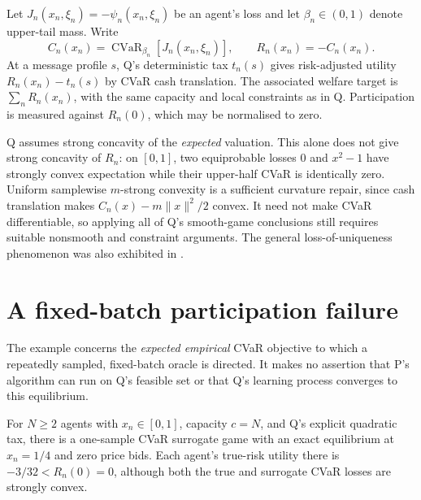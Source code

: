 \documentclass{article}
\begin{document}
Let \(J_n(x_n,\xi_n)=-\psi_n(x_n,\xi_n)\) be an agent's loss and let \(\beta_n\in(0,1)\) denote upper-tail mass. Write
\[
 C_n(x_n)=\operatorname{CVaR}_{\beta_n}[J_n(x_n,\xi_n)],
 \qquad R_n(x_n)=-C_n(x_n).
\]
At a message profile \(s\), Q's deterministic tax \(t_n(s)\) gives risk-adjusted utility \(R_n(x_n)-t_n(s)\) by CVaR cash translation. The associated welfare target is \(\sum_n R_n(x_n)\), with the same capacity and local constraints as in Q. Participation is measured against \(R_n(0)\), which may be normalised to zero. %

Q assumes strong concavity of the \emph{expected} valuation. This alone does not give strong concavity of \(R_n\): on \([0,1]\), two equiprobable losses \(0\) and \(x^2-1\) have strongly convex expectation while their upper-half CVaR is identically zero. Uniform samplewise \(m\)-strong convexity is a sufficient curvature repair, since cash translation makes \(C_n(x)-m\|x\|^2/2\) convex. It need not make CVaR differentiable, so applying all of Q's smooth-game conclusions still requires suitable nonsmooth and constraint arguments. The general loss-of-uniqueness phenomenon was also exhibited in \cite{wang2024learning}. %

\section{A fixed-batch participation failure}

The example concerns the \emph{expected empirical} CVaR objective to which a repeatedly sampled, fixed-batch oracle is directed. It makes no assertion that P's algorithm can run on Q's feasible set or that Q's learning process converges to this equilibrium. %

\begin{proposition}
For \(N\geq2\) agents with \(x_n\in[0,1]\), capacity \(c=N\), and Q's explicit quadratic tax, there is a one-sample CVaR surrogate game with an exact equilibrium at \(x_n=1/4\) and zero price bids. Each agent's true-risk utility there is \(-3/32<R_n(0)=0\), although both the true and surrogate CVaR losses are strongly convex. %
\end{proposition}
\end{document}
